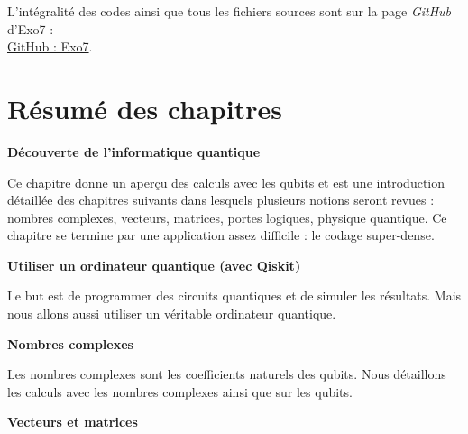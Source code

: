   

\bigskip
\vspace*{\fill}
\begin{center}
L'intégralité des codes \Python{} ainsi que tous les fichiers sources sont sur la page \emph{GitHub} d'Exo7 :\\
\href{https://github.com/exo7math/}{\og{}GitHub : Exo7\fg{}}.
\end{center}





\cleardoublepage
\thispagestyle{empty}
\tableofcontents

\cleardoublepage
\section*{Résumé des chapitres}


\newcommand{\titrechapitre}[1]{{\textbf{#1}}\nopagebreak}
\newcommand{\descriptionchapitre}[1]{%
\smallskip\hfill
\begin{minipage}{0.95\textwidth}\small#1\end{minipage}\medskip\smallskip}


\titrechapitre{Découverte de l'informatique quantique}

\descriptionchapitre{Ce chapitre donne un aperçu des calculs avec les qubits et est une introduction détaillée des chapitres suivants dans lesquels plusieurs notions seront revues : nombres complexes, vecteurs, matrices, portes logiques, physique quantique. Ce chapitre se termine par une application assez difficile : le codage super-dense.}

\titrechapitre{Utiliser un ordinateur quantique (avec Qiskit)}

\descriptionchapitre{Le but est de programmer des circuits quantiques et de simuler les résultats. Mais nous allons aussi utiliser un véritable ordinateur quantique.}

\titrechapitre{Nombres complexes}

\descriptionchapitre{Les nombres complexes sont les coefficients naturels des qubits. Nous détaillons les calculs avec les nombres complexes ainsi que sur les qubits.}

\titrechapitre{Vecteurs et matrices}

